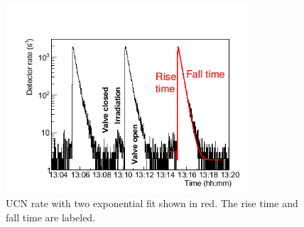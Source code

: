 \begin{figure}[h!]
  \centering
  \includegraphics[width=0.8\textwidth]{risefalltime.png}
  \caption{UCN rate with two exponential fit shown in red. The rise
    time and fall time are labeled.}
  \label{fig:risefalltime}
\end{figure}


